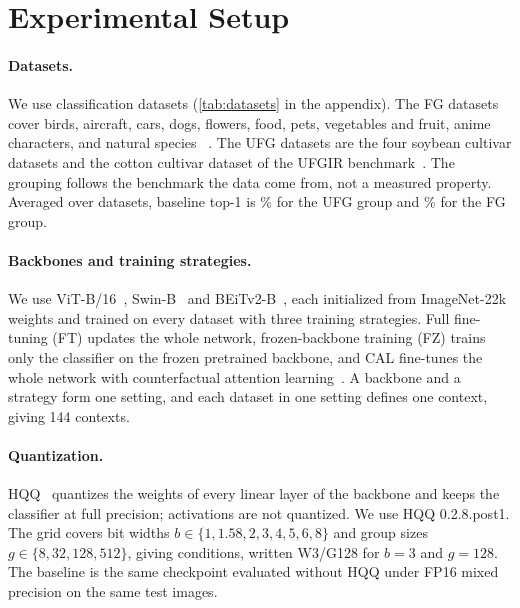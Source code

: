 \section{Experimental Setup}
\label{sec:setup}

\paragraph{Datasets.}
We use  classification datasets (\cref{tab:datasets} in the appendix).
The  FG datasets cover birds, aircraft, cars, dogs, flowers, food, pets, vegetables and fruit, anime characters, and natural species~\cite{wah2011cub,vanhorn2015nabirds,maji2013fine,krause2013cars,khosla2011dogs,nilsback2008flowers,bossard2014food,parkhi2012pets,hou2017vegfru,vanhorn2018inat} .
The  UFG datasets are the four soybean cultivar datasets and the cotton cultivar dataset of the UFGIR benchmark~\cite{yu2021benchmark}.
The grouping follows the benchmark the data come from, not a measured property.
Averaged over datasets, baseline top-1 is \% for the UFG group and \% for the FG group.

\paragraph{Backbones and training strategies.}
We use ViT-B/16~\cite{dosovitskiy2021vit}, Swin-B~\cite{liu2021swin} and BEiTv2-B~\cite{peng2022beitv2}, each initialized from ImageNet-22k weights and trained on every dataset with three training strategies.
Full fine-tuning (FT) updates the whole network, frozen-backbone training (FZ) trains only the classifier on the frozen pretrained backbone, and CAL fine-tunes the whole network with counterfactual attention learning~\cite{rao2021cal}.
A backbone and a strategy form one setting, and each dataset in one setting defines one context, giving 144 contexts.

\paragraph{Quantization.}
HQQ~\cite{badri2023hqq} quantizes the weights of every linear layer of the backbone and keeps the classifier at full precision; activations are not quantized. We use HQQ 0.2.8.post1.
The grid covers bit widths $b \in \{1, 1.58, 2, 3, 4, 5, 6, 8\}$ and group sizes $g \in \{8, 32, 128, 512\}$, giving  conditions, written W3/G128 for $b=3$ and $g=128$.
The baseline is the same checkpoint evaluated without HQQ under FP16 mixed precision on the same test images.

